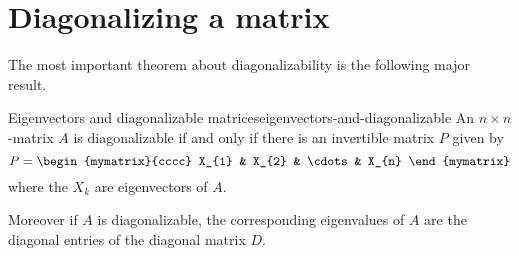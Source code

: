 \section{Diagonalizing a matrix}

The most important theorem about diagonalizability is the following major result.

\begin{theorem}{Eigenvectors and diagonalizable matrices}{eigenvectors-and-diagonalizable}
An $n\times n$-matrix $A$ is diagonalizable if and only if there is an
invertible matrix $P$ given by 
\begin{equation*}
P=\begin{mymatrix}{cccc}
X_{1} & X_{2} & \cdots & X_{n}
\end{mymatrix}
\end{equation*}
where the $X_{k}$ are eigenvectors of $A$. 

Moreover if $A$ is diagonalizable, the corresponding eigenvalues of $A$ are the
diagonal entries of the diagonal matrix $D$.
\end{theorem}

